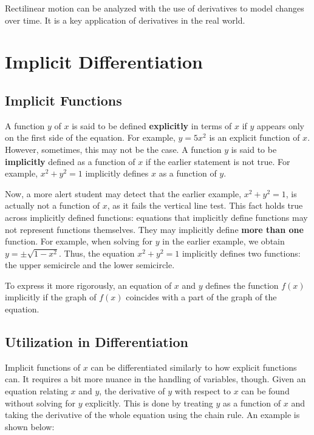 \documentclass[11pt]{article}
\begin{document}
Rectilinear motion can be analyzed with the use of derivatives to model changes over time. It is a key application of derivatives in the real world.


\section{Implicit Differentiation}

\subsection{Implicit Functions}
A function $y$ of $x$ is said to be defined \textbf{explicitly} in terms of $x$ if $y$ appears only on the first side of the equation. For example, $y = 5x^2$ is an explicit function of $x$. However, sometimes, this may not be the case. A function $y$ is said to be \textbf{implicitly} defined as a function of $x$ if the earlier statement is not true. For example, $x^2+y^2=1$ implicitly defines $x$ as a function of $y$. 

Now, a more alert student may detect that the earlier example, $x^2+y^2=1$, is actually not a function of $x$, as it fails the vertical line test. This fact holds true across implicitly defined functions: equations that implicitly define functions may not represent functions themselves. They may implicitly define \textbf{more than one} function. For example, when solving for $y$ in the earlier example, we obtain $y=\pm \sqrt{1-x^2}$. Thus, the equation $x^2+y^2=1$ implicitly defines two functions: the upper semicircle and the lower semicircle.

To express it more rigorously, an equation of $x$ and $y$ defines the function $f(x)$ implicitly if the graph of $f(x)$ coincides with a part of the graph of the equation. 

\subsection{Utilization in Differentiation}
Implicit functions of $x$ can be differentiated similarly to how explicit functions can. It requires a bit more nuance in the handling of variables, though. Given an equation relating $x$ and $y$, the derivative of $y$ with respect to $x$ can be found without solving for $y$ explicitly. This is done by treating $y$ as a function of $x$ and taking the derivative of the whole equation using the chain rule. An example is shown below:
\end{document}
